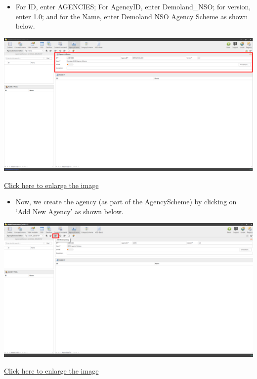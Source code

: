 \documentclass[
]{book}
\providecommand{\tightlist}{%
  \setlength{\itemsep}{0pt}\setlength{\parskip}{0pt}}
\begin{document}
\begin{itemize}
\tightlist
\item
  For ID, enter AGENCIES; For AgencyID, enter Demoland\_NSO; for version, enter 1.0; and for the Name, enter Demoland NSO Agency Scheme as shown below.
\end{itemize}

\begin{center}\includegraphics[width=1\linewidth]{./images/image062} \end{center}

\href{images/image062.png}{Click here to enlarge the image}

\begin{itemize}
\tightlist
\item
  Now, we create the agency (as part of the AgencyScheme) by clicking on `Add New Agency' as shown below.
\end{itemize}

\begin{center}\includegraphics[width=1\linewidth]{./images/image064} \end{center}

\href{images/image064.png}{Click here to enlarge the image}
\end{document}

